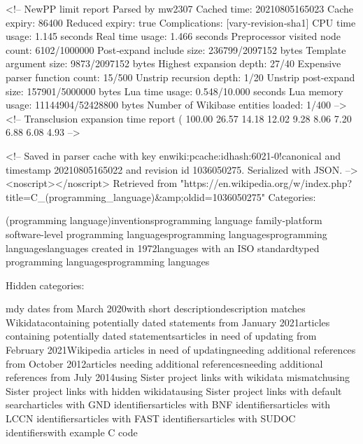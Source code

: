 \documentclass{article}\usepackage{titlesec}
\begin{document}
<!-- 
NewPP limit report
Parsed by mw2307
Cached time: 20210805165023
Cache expiry: 86400
Reduced expiry: true
Complications: [vary‐revision‐sha1]
CPU time usage: 1.145 seconds
Real time usage: 1.466 seconds
Preprocessor visited node count: 6102/1000000
Post‐expand include size: 236799/2097152 bytes
Template argument size: 9873/2097152 bytes
Highest expansion depth: 27/40
Expensive parser function count: 15/500
Unstrip recursion depth: 1/20
Unstrip post‐expand size: 157901/5000000 bytes
Lua time usage: 0.548/10.000 seconds
Lua memory usage: 11144904/52428800 bytes
Number of Wikibase entities loaded: 1/400
-->
<!--
Transclusion expansion time report (%
100.00%
 26.57%
 14.18%
 12.02%
  9.28%
  8.06%
  7.20%
  6.88%
  6.08%
  4.93%
-->

<!-- Saved in parser cache with key enwiki:pcache:idhash:6021-0!canonical and timestamp 20210805165022 and revision id 1036050275. Serialized with JSON.
 -->
<noscript></noscript>
Retrieved from "https://en.wikipedia.org/w/index.php?title=C\_(programming\_language)&amp;oldid=1036050275"
		Categories: \begin{itemize}\itemC (programming language)\itemAmerican inventions\itemC programming language family\itemCross-platform software\itemHigh-level programming languages\itemProcedural programming languages\itemStructured programming languages\itemProgramming languages created in 1972\itemProgramming languages with an ISO standard\itemStatically typed programming languages\itemSystems programming languages\end{itemize}Hidden categories: \begin{itemize}\itemUse mdy dates from March 2020\itemArticles with short description\itemShort description matches Wikidata\itemArticles containing potentially dated statements from January 2021\itemAll articles containing potentially dated statements\itemWikipedia articles in need of updating from February 2021\itemAll Wikipedia articles in need of updating\itemArticles needing additional references from October 2012\itemAll articles needing additional references\itemArticles needing additional references from July 2014\itemPages using Sister project links with wikidata mismatch\itemPages using Sister project links with hidden wikidata\itemPages using Sister project links with default search\itemWikipedia articles with GND identifiers\itemWikipedia articles with BNF identifiers\itemWikipedia articles with LCCN identifiers\itemWikipedia articles with FAST identifiers\itemWikipedia articles with SUDOC identifiers\itemArticles with example C code\end{itemize}
	
\end{document}

